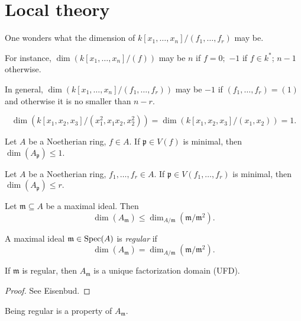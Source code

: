 \section{Local theory}
One wonders what the dimension of \(k[x_1, \dotsc, x_n] / {(f_1, \dotsc, f_r)}\) may be.

For instance, \(\dim(k[x_1, \dotsc, x_n]/{(f)})\) may be \(n\) if \(f=0;\) \(-1\) if \(f \in k^*\); \(n-1\) otherwise.

In general, \(\dim(k[x_1, \dotsc, x_n]/{(f_1, \dotsc, f_r)})\) may be \(-1\) if \((f_1, \dotsc, f_r) = (1)\) and otherwise it is no smaller than \(n - r.\)

\begin{example}
  \[\dim(k[x_1, x_2, x_3]/{(x_1^2, x_1 x_2, x_2^2)}) = \dim(k[x_1, x_2, x_3]/{(x_1, x_2)}) = 1.\]
\end{example}

\begin{theorem}
  Let \(A\) be a Noetherian ring, \(f \in A.\) If \(\mathfrak p \in V(f)\) is minimal, then
  \(\dim(A_{\mathfrak p}) \leq 1.\)
\end{theorem}

\begin{corollary}
  Let \(A\) be a Noetherian ring, \(f_1, \dotsc, f_r \in A.\) If \(\mathfrak p \in V(f_1, \dotsc, f_r)\) is minimal, then \(\dim(A_{\mathfrak p}) \leq r.\)
\end{corollary}

\begin{corollary}
  Let \(\mathfrak m \subseteq A\) be a  maximal ideal. Then
  \[\dim(A_{\mathfrak m}) \leq \dim_{A/{\mathfrak m}} (\mathfrak m /{\mathfrak m^2}).\] 
\end{corollary}

\begin{df}
  A maximal ideal \(\mathfrak m \in \text{Spec}(A)\) is \emph{regular} if
  \[\dim(A_{\mathfrak m}) = \dim_{A/{\mathfrak m}} (\mathfrak m /{\mathfrak m^2}).\]
\end{df}

\begin{theorem}
  If \(\mathfrak m\) is regular, then \(A_{\mathfrak m}\) is a unique factorization domain (UFD).
\end{theorem}
\begin{proof}
  See Eisenbud.
\end{proof}

\begin{note}
  Being regular is a property of \(A_{\mathfrak m}.\)
\end{note}

